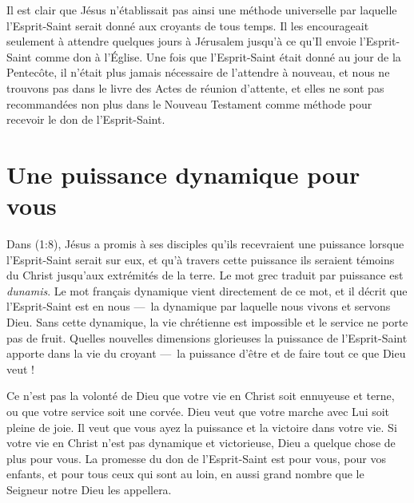 Il est clair que Jésus n'établissait pas ainsi une méthode universelle par
 laquelle l'Esprit-Saint serait donné aux croyants de tous temps. Il les
 encourageait seulement à attendre quelques jours à Jérusalem jusqu'à ce
 qu'Il envoie l'Esprit-Saint comme don à l'Église. Une fois que
 l'Esprit-Saint était donné au jour de la Pentecôte, il n'était plus
 jamais nécessaire de l'attendre à nouveau, et nous ne trouvons pas dans
 le livre des Actes de réunion d'attente, et elles ne sont pas recommandées
 non plus dans le Nouveau Testament comme méthode pour recevoir le don de
 l'Esprit-Saint.


\section*{Une puissance dynamique pour vous}

Dans (1:8), Jésus a promis à ses disciples
 qu'ils recevraient une puissance lorsque l'Esprit-Saint serait
 sur eux, et qu'à travers cette puissance ils seraient témoins
 du Christ jusqu'aux extrémités de la terre.
 Le mot grec traduit par \og puissance \fg{} est \emph{dunamis}.
 Le mot français \og dynamique \fg{} vient directement de ce mot,
 et il décrit que l'Esprit-Saint est en nous ---~la dynamique par laquelle
 nous vivons et servons Dieu. Sans cette dynamique, la vie chrétienne est
 impossible et le service ne porte pas de fruit.
 Quelles nouvelles dimensions glorieuses la puissance de l'Esprit-Saint
 apporte dans la vie du croyant ---~la puissance d'être et de faire
 tout ce que Dieu veut !

Ce n'est pas la volonté de Dieu que votre vie en Christ soit ennuyeuse
 et terne, ou que votre service soit une corvée.
 Dieu veut que votre marche avec Lui soit pleine de joie.
 Il veut que vous ayez la puissance et la victoire dans votre vie.
 Si votre vie en Christ n'est pas dynamique et victorieuse,
 Dieu a quelque chose de plus pour vous.
 La promesse du don de l'Esprit-Saint est \og pour vous, pour vos enfants,
 et pour tous ceux qui sont au loin,
 en aussi grand nombre que le Seigneur notre Dieu les appellera. \fg{}

